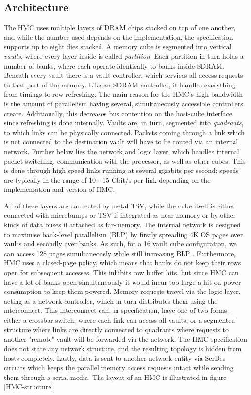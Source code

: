 \subsection{Architecture}
The HMC uses multiple layers of DRAM chips stacked on top of one another, and while the number used depends on the implementation, the specification supports up to eight dies stacked. A memory cube is segmented into vertical \emph{vaults}, where every layer inside is called \emph{partition}. Each partition in turn holds a number of banks, where each operate identically to banks inside SDRAM. Beneath every vault there is a vault controller, which services all access requests to that part of the memory. Like an SDRAM controller, it handles everything from timings to row refreshing. The main reason for the HMC's high bandwidth is the amount of parallelism having several, simultaneously accessible controllers create. Additionally, this decreases bus contention on the host-cube interface since refreshing is done internally. Vaults are, in turn, segmented into \emph{quadrants}, to which links can be physically connected. Packets coming through a link which is not connected to the destination vault will have to be routed via an internal network. Further below lies the network and logic layer, which handles internal packet switching, communication with the processor, as well as other cubes. This is done through high speed links running at several gigabits per second; speeds are typically in the range of 10 - 15 Gbit/s per link depending on the implementation and version of HMC.
\bigskip

All of these layers are connected by metal TSV, while the cube itself is either connected with microbumps or TSV if integrated as near-memory or by other kinds of data buses if attached as far-memory. The internal network is designed to maximise bank-level parallelism (BLP) by firstly spreading 4K OS pages over vaults and secondly over banks. As such, for a 16 vault cube configuration, we can access 128 pages simultaneously while still increasing BLP \cite{8167757}. Furthermore, HMC uses a closed-page policy, which means that banks do not keep their rows open for subsequent accesses. This inhibits row buffer hits, but since HMC can have a lot of banks open simultaneously it would incur too large a hit on power consumption to keep them powered. Memory requests travel via the logic layer, acting as a network controller, which in turn distributes them using the interconnect. This interconnect can, in specification, have one of two forms -- either a crossbar switch, where each link can access all vaults, or a segmented structure where links are directly connected to quadrants where requests to another "remote" vault will be forwarded via the network. The HMC specification does not state any network structure, and the resulting topology is hidden from hosts completely. Lastly, data is sent to another network entity via SerDes circuits which keeps the parallel memory access requests intact while sending them through a serial media. The layout of an HMC is illustrated in figure \ref{HMC-structure}. 
\bigskip

